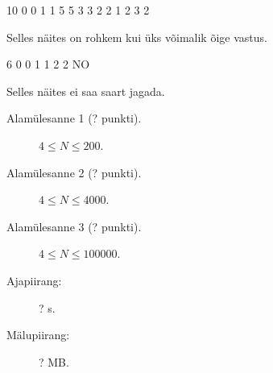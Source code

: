 ﻿\documentclass{boi2014-et}
\begin{document}
    \Examples
    \example
    {
        10  0  0  1  1  5  5  3  3  2  2
    }
    {
        1 2 3 2
    }
    {
        Selles näites on rohkem kui üks võimalik õige vastus.

        \begin{center}
        \end{center}
    }

    \example
    {
        6  0  0  1  1  2  2
    }
    {
        NO
    }
    {
        Selles näites ei saa saart jagada.
        \begin{center}
        \end{center}
    }

    \Scoring

    \begin{description}
        \item[Alamülesanne 1 (? punkti).] $4 \le N \le 200$.
        \item[Alamülesanne 2 (? punkti).] $4 \le N \le 4 000$.
        \item[Alamülesanne 3 (? punkti).] $4 \le N \le 100 000$.
    \end{description}

    \Constraints

    \begin{description}
        \item[Ajapiirang:] ? s.
        \item[Mälupiirang:] ? MB.
    \end{description}
\end{document}
